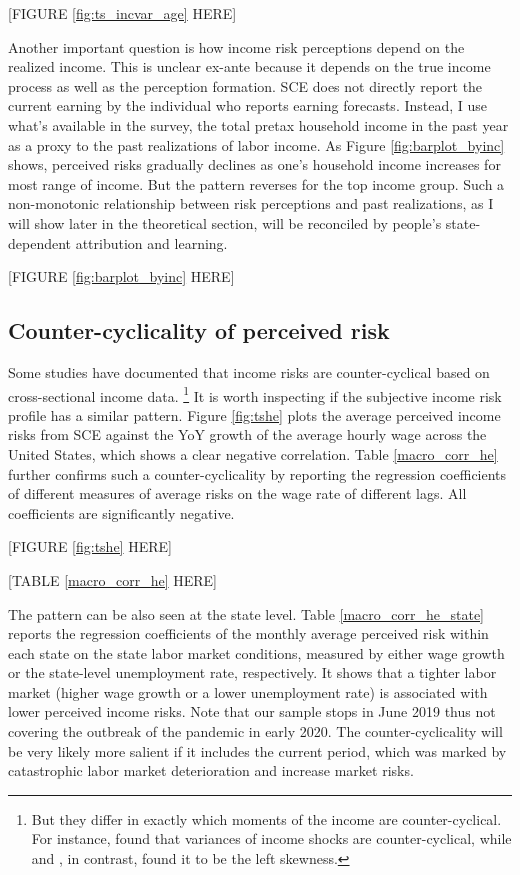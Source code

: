 \documentclass[12pt,notitlepage,onecolumn,aps,pra]{article}
\begin{document}
{[}FIGURE \ref{fig:ts_incvar_age} HERE{]}

Another important question is how income risk perceptions depend on the
realized income. This is unclear ex-ante because it depends on the true
income process as well as the perception formation. SCE does not
directly report the current earning by the individual who reports
earning forecasts. Instead, I use what's available in the survey, the
total pretax household income in the past year as a proxy to the past
realizations of labor income. As Figure \ref{fig:barplot_byinc} shows,
perceived risks gradually declines as one's household income increases
for most range of income. But the pattern reverses for the top income
group. Such a non-monotonic relationship between risk perceptions and
past realizations, as I will show later in the theoretical section, will
be reconciled by people's state-dependent attribution and learning.

{[}FIGURE \ref{fig:barplot_byinc} HERE{]}




    \hypertarget{counter-cyclicality-of-perceived-risk}{%
\subsection{Counter-cyclicality of perceived
risk}\label{counter-cyclicality-of-perceived-risk}}

Some studies have documented that income risks are counter-cyclical
based on cross-sectional income data.
\footnote{But they differ in exactly which moments of the income are counter-cyclical. For instance, \cite{storesletten2004cyclical} found that variances of income shocks are counter-cyclical, while \cite{guvenen2014nature} and \cite{catherine_countercyclical_2019}, in contrast, found it to be the left skewness.}
It is worth inspecting if the subjective income risk profile has a
similar pattern. Figure \ref{fig:tshe} plots the average perceived
income risks from SCE against the YoY growth of the average hourly wage
across the United States, which shows a clear negative correlation.
Table \ref{macro_corr_he} further confirms such a counter-cyclicality by
reporting the regression coefficients of different measures of average
risks on the wage rate of different lags. All coefficients are
significantly negative.

{[}FIGURE \ref{fig:tshe} HERE{]}

{[}TABLE \ref{macro_corr_he} HERE{]}

The pattern can be also seen at the state level. Table
\ref{macro_corr_he_state} reports the regression coefficients of the
monthly average perceived risk within each state on the state labor
market conditions, measured by either wage growth or the state-level
unemployment rate, respectively. It shows that a tighter labor market
(higher wage growth or a lower unemployment rate) is associated with
lower perceived income risks. Note that our sample stops in June 2019
thus not covering the outbreak of the pandemic in early 2020. The
counter-cyclicality will be very likely more salient if it includes the
current period, which was marked by catastrophic labor market
deterioration and increase market risks.
\end{document}
